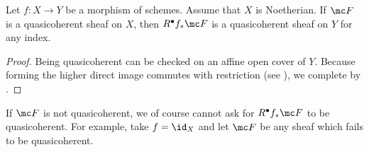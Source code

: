 \documentclass[../notes.tex]{subfiles}
\begin{document}
\begin{corollary}
	Let $f\colon X\to Y$ be a morphism of schemes. Assume that $X$ is Noetherian. If $\mc F$ is a quasicoherent sheaf on $X$, then $R^\bullet f_*\mc F$ is a quasicoherent sheaf on $Y$ for any index.
\end{corollary}
\begin{proof}
	Being quasicoherent can be checked on an affine open cover of $Y$. Because forming the higher direct image commutes with restriction (see ), we complete by .
\end{proof}
\begin{remark}
	If $\mc F$ is not quasicoherent, we of course cannot ask for $R^\bullet f_*\mc F$ to be quasicoherent. For example, take $f=\id_X$ and let $\mc F$ be any sheaf which fails to be quasicoherent.
\end{remark}
\end{document}

